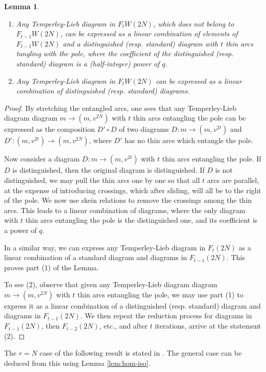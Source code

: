 \documentclass[12pt]{amsart}
\newtheorem{lemma}[theorem]{Lemma}
\theoremstyle{definition}
\theoremstyle{remark}
\numberwithin{equation}{section}
\begin{document}
\begin{lemma} \label{lem:reduct}
\begin{enumerate}
\item Any Temperley-Lieb diagram in $F_tW(2N)$, which does not belong to $F_{t-1}W(2N)$,  can be expressed as a linear 
combination of  elements of $F_{t-1}W(2N)$ and a distinguished (resp. standard) diagram  with $t$ thin arcs tangling with the pole, 
where the coefficient of the distinguished (resp. standard) diagram is a (half-integer) power of $q$. 
\item Any Temperley-Lieb diagram in $F_tW(2N)$ can be expressed as a linear combination of  distinguished (resp. standard) diagrams. 
\end{enumerate}
\end{lemma}
\begin{proof}
By stretching the entangled arcs, one sees that
any Temperley-Lieb diagram diagram  $m\to (m, v^{2N})$  with $t$ thin arcs entangling the pole can be expressed as the 
composition $D'\circ D$ of two diagrams $D:  m\to (m, v^{2t})$  and $D':  (m, v^{2t}) \to (m, v^{2N})$, where  $D'$ has
no thin arcs which entangle the pole.  


Now consider a diagram $D:  m\to (m, v^{2t})$ with $t$ thin arcs entangling the pole. If $D$ is distinguished, then the original 
diagram is distinguished. If $D$ is not distinguished, we may pull the thin arcs one by one so that all $t$ arcs are parallel,
at the expense of introducing crossings, which after sliding, will all be to the right of the pole.  
We now use skein relations to remove the crossings among the thin arcs. This leads to a 
linear combination of diagrams, where the only diagram with $t$ thin arcs entangling the pole is the distinguished one, and its coefficient is a power of $q$. 

In a similar way, we can express any Temperley-Lieb diagram in $F_t(2N)$   as a linear combination of a standard diagram and diagrams in $F_{t-1}(2N)$. 
This proves part (1) of the Lemma.



To see (2), observe that
given any Temperley-Lieb diagram diagram  $m\to (m, v^{2N})$  with $t$ thin arcs entangling the pole, we may use 
part (1) to express it as a linear combination of a distinguished (resp. standard) diagram and diagrams in $F_{t-1}(2N)$. 
We then repeat the reduction process for diagrams in $F_{t-1}(2N)$, then $F_{t-2}(2N)$, etc., and after $t$ iterations,
arrive at the statement (2).  
\end{proof}
The $r=N$ case of the following result is stated in \cite{GL98, GL03}. The general case can be deduced from this using Lemma \ref{lem:hom-iso}. 
\end{document}
